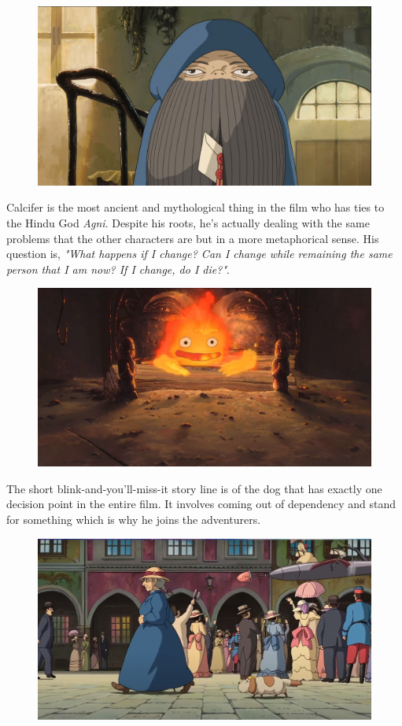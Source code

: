 \documentclass[11pt, letterpaper]{article}
\begin{document}
\begin{figure}[H]
\includegraphics[width=\textwidth]{acting_old.jpg}
\centering
\end{figure}

Calcifer is the most ancient and mythological thing in the film who has ties to the Hindu God \textit{Agni}. Despite his roots, he's actually dealing with the same problems that the other characters are but in a more metaphorical sense. His question is, \textit{"What happens if I change? Can I change while remaining the same person that I am now? If I change, do I die?"}. 

\begin{figure}[H]
\includegraphics[width=\textwidth]{ancient.jpg}
\centering
\end{figure}

The short blink-and-you'll-miss-it story line is of the dog that has exactly one decision point in the entire film. It involves coming out of dependency and stand for something which is why he joins the adventurers. 

\begin{figure}[H]
\includegraphics[width=\textwidth]{blink-and-miss.jpg}
\centering
\end{figure}
\end{document}
